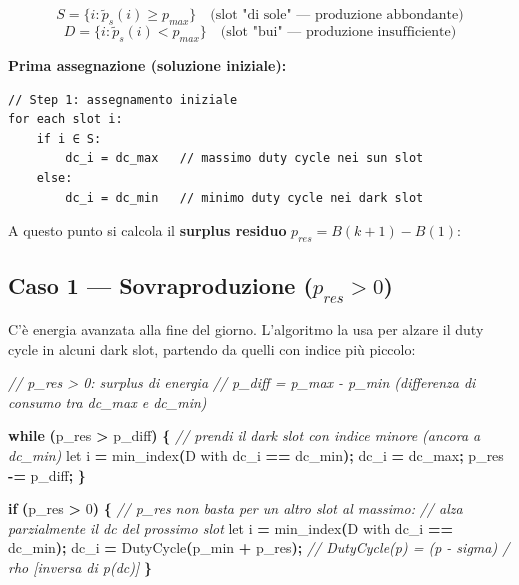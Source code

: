\documentclass[
  italian,
  openany]{book}
\newenvironment{Shaded}{\begin{snugshade}}{\end{snugshade}}
\newcommand{\CommentTok}[1]{\textcolor[rgb]{0.56,0.35,0.01}{\textit{#1}}}
\newcommand{\ControlFlowTok}[1]{\textcolor[rgb]{0.13,0.29,0.53}{\textbf{#1}}}
\newcommand{\DecValTok}[1]{\textcolor[rgb]{0.00,0.00,0.81}{#1}}
\newcommand{\NormalTok}[1]{#1}
\newcommand{\OperatorTok}[1]{\textcolor[rgb]{0.81,0.36,0.00}{\textbf{#1}}}
\begin{document}
\[
S = \{i : \tilde{p}_s(i) \geq p_{max}\} \quad \text{(slot "di sole" — produzione abbondante)}
\] \[
D = \{i : \tilde{p}_s(i) < p_{max}\} \quad \text{(slot "bui" — produzione insufficiente)}
\]

\textbf{Prima assegnazione (soluzione iniziale):}

\begin{verbatim}
// Step 1: assegnamento iniziale
for each slot i:
    if i ∈ S:
        dc_i = dc_max   // massimo duty cycle nei sun slot
    else:
        dc_i = dc_min   // minimo duty cycle nei dark slot
\end{verbatim}

A questo punto si calcola il \textbf{surplus residuo}
\(p_{res} = B(k+1) - B(1)\):

\subsection{\texorpdfstring{Caso 1 --- Sovraproduzione
(\(p_{res} > 0\))}{Caso 1 --- Sovraproduzione (p\_\{res\} \textgreater{} 0)}}\label{caso-1-sovraproduzione-p_res-0}

C'è energia avanzata alla fine del giorno. L'algoritmo la usa per alzare
il duty cycle in alcuni dark slot, partendo da quelli con indice più
piccolo:

\begin{Shaded}
\begin{Highlighting}[]
\CommentTok{// p\_res \textgreater{} 0: surplus di energia}
\CommentTok{// p\_diff = p\_max {-} p\_min (differenza di consumo tra dc\_max e dc\_min)}

\ControlFlowTok{while} \OperatorTok{(}\NormalTok{p\_res }\OperatorTok{\textgreater{}}\NormalTok{ p\_diff}\OperatorTok{)} \OperatorTok{\{}
    \CommentTok{// prendi il dark slot con indice minore (ancora a dc\_min)}
\NormalTok{    let i }\OperatorTok{=}\NormalTok{ min\_index}\OperatorTok{(}\NormalTok{D with dc\_i }\OperatorTok{==}\NormalTok{ dc\_min}\OperatorTok{);}
\NormalTok{    dc\_i }\OperatorTok{=}\NormalTok{ dc\_max}\OperatorTok{;}
\NormalTok{    p\_res }\OperatorTok{{-}=}\NormalTok{ p\_diff}\OperatorTok{;}
\OperatorTok{\}}

\ControlFlowTok{if} \OperatorTok{(}\NormalTok{p\_res }\OperatorTok{\textgreater{}} \DecValTok{0}\OperatorTok{)} \OperatorTok{\{}
    \CommentTok{// p\_res non basta per un altro slot al massimo:}
    \CommentTok{// alza parzialmente il dc del prossimo slot}
\NormalTok{    let i }\OperatorTok{=}\NormalTok{ min\_index}\OperatorTok{(}\NormalTok{D with dc\_i }\OperatorTok{==}\NormalTok{ dc\_min}\OperatorTok{);}
\NormalTok{    dc\_i }\OperatorTok{=}\NormalTok{ DutyCycle}\OperatorTok{(}\NormalTok{p\_min }\OperatorTok{+}\NormalTok{ p\_res}\OperatorTok{);}
    \CommentTok{// DutyCycle(p) = (p {-} sigma) / rho  [inversa di p(dc)]}
\OperatorTok{\}}
\end{Highlighting}
\end{Shaded}
\end{document}
